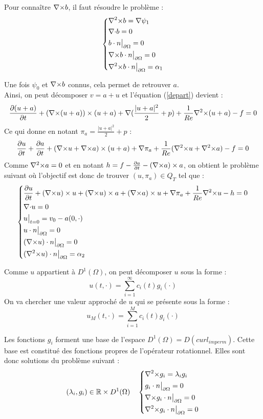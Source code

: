 Pour connaître ${\nabla\times} b$, il faut résoudre le problème :
\begin{eqnarray}
\label{curlb}
\left\{
\begin{aligned}
&{\nabla^2\times} b = {\nabla}\psi_1\\
&{\nabla\cdot} b = 0\\
&b\cdot n{\big\rvert_{\partial\Omega}} = 0\\
&{\nabla\times} b\cdot n{\big\rvert_{\partial\Omega}} = 0\\
&{\nabla^2\times} b\cdot n{\big\rvert_{\partial\Omega}} = \alpha_1
\end{aligned}
\right.
\end{eqnarray}

Une fois $\psi_0$ et ${\nabla\times} b$ connus, cela permet de retrouver $a$.\\

Ainsi, on peut décomposer $v=a+u$ et l'équation (\ref{depart}) devient :
\[
\frac{\partial(u+a)}{\partial t}+({\nabla\times}(u+a))\times(u+a) + {\nabla} (\frac{|u+a|^2}{2}+p) + \frac{1}{Re}{\nabla^2\times}(u+a) - f = 0
\]
Ce qui donne en notant $\pi_a=\frac{|u+a|^2}{2}+p$ :
\[
\frac{\partial u}{\partial t}+\frac{\partial a}{\partial t} + ({\nabla\times} u+{\nabla\times} a)\times(u+a) + {\nabla}\pi_a + \frac{1}{Re}({\nabla^2\times} u+{\nabla^2\times} a) - f = 0
\]
Comme ${\nabla^2\times} a = 0$ et en notant $h=f-\frac{\partial a}{\partial t} - ({\nabla\times} a)\times a$, on obtient le problème suivant où l'objectif est donc de trouver $(u,\pi_a)\in Q_T$ tel que :
\begin{eqnarray}
\label{uci}
\left\{
\begin{aligned}
&\frac{\partial u}{\partial t} + ({\nabla\times} u)\times u + ({\nabla\times} u)\times a +({\nabla\times} a)\times u + {\nabla} \pi_a +\frac{1}{Re}{\nabla^2\times}  u - h = 0\\
&{\nabla\cdot} u = 0\\
&u\big\rvert_{t=0} = v_0 - a(0,\cdot)\\
&u\cdot n{\big\rvert_{\partial\Omega}} = 0\\
&({\nabla\times} u)\cdot n{\big\rvert_{\partial\Omega}} = 0\\
&({\nabla^2\times}  u)\cdot n{\big\rvert_{\partial\Omega}} = \alpha_2
\end{aligned}
\right.
\end{eqnarray}

Comme $u$ appartient à $D^1(\Omega)$, on peut décomposer $u$ sous la forme :
\[
u(t,\cdot) = \sum_{i=1}^{\infty} c_i(t)g_i(\cdot)
\]
On va chercher une valeur approché de $u$ qui se présente sous la forme :
\[
u_M(t,\cdot) = \sum_{i=1}^{M} c_i(t)g_i(\cdot)
\]

Les fonctions $g_i$ forment une base de l'espace $D^1(\Omega) = D(curl_{imperm})$. Cette base est constitué des fonctions propres de l'opérateur rotationnel. Elles sont donc solutions du problème suivant :
\begin{eqnarray}
\label{curlcurl}
(\lambda_i,g_i)\in{\mathbb{R}}\times D^1(\Omega)\quad \left\{
\begin{aligned}
&{\nabla^2\times}  g_i = \lambda_i g_i\\
&g_i\cdot n{\big\rvert_{\partial\Omega}} = 0\\
&{\nabla\times} g_i\cdot n{\big\rvert_{\partial\Omega}} = 0\\
&{\nabla^2\times}  g_i\cdot n{\big\rvert_{\partial\Omega}} = 0
\end{aligned}
\right.
\end{eqnarray}

